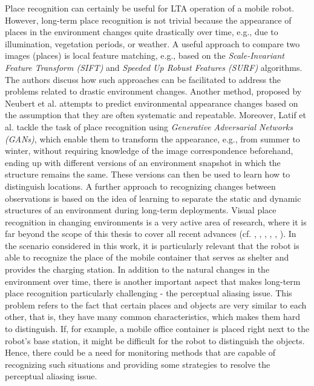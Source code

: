 \documentclass[english, master, utf8]{base/thesis_KBS}
\begin{document}
\noindent
Place recognition can certainly be useful for LTA operation of a mobile robot. However, long-term place recognition is not trivial because 
the appearance of places in the environment changes quite drastically over time, e.g., due to illumination, vegetation periods, or weather. \cite{Han:2018}
A useful approach to compare two images (places) is local feature matching, e.g., based on the \textit{Scale-Invariant Feature Transform (SIFT)} and
\textit{Speeded Up Robust Features (SURF)} algorithms. \cite{Valgren:2007} The authors discuss how such approaches can be facilitated to address the problems related to drastic
environment changes. Another method, proposed by Neubert et al. \cite{Neubert:2013} attempts to predict environmental appearance changes based on the assumption that they are
often systematic and repeatable. Moreover, Latif et al. tackle the task of place recognition using \textit{Generative Adversarial Networks (GANs)}, which enable them to transform the appearance, e.g., from summer
to winter, without requiring knowledge of the image correspondence beforehand, ending up with different versions of an environment snapshot in which the structure remains the same.
\cite{Latif:2018} These versions can then be used to learn how to distinguish locations. A further approach to recognizing changes between observations is based on the idea of
learning to separate the static and dynamic structures of an environment during long-term deployments. \cite{Ambrus:2014}
Visual place recognition in changing environments is a very active area of research, where it is far beyond the scope of this thesis to cover all recent advances (cf. \cite{Porav:2018},
\cite{LowrySur:2016}, \cite{Suenderhauf:2013}, \cite{Lowry:2016}, \cite{Milford:2012}, \cite{Churchill:2013}). In the scenario considered in this work, it is particularly relevant that the robot is able to recognize the place of the mobile container
that serves as shelter and provides the charging station. In addition to the natural changes in the environment over time, there is another important aspect
that makes long-term place recognition particularly challenging - the perceptual aliasing issue. This problem refers to the fact that certain places and objects are very 
similar to each other, that is, they have many common characteristics, which makes them hard to distinguish. \cite{Han:2018}
If, for example, a mobile office container is placed right next to the robot's base station, it might be difficult for the robot to distinguish the objects.
Hence, there could be a need for monitoring methods that are capable of recognizing such situations and providing some strategies to resolve the perceptual aliasing issue.\newline
\end{document}
